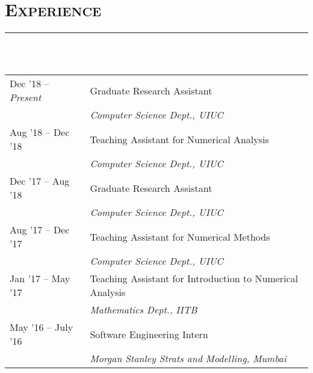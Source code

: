 \documentclass[letterpaper, 12pt]{article}
\begin{document}

\section*{\Large\textsc{Experience}}
\vspace{-4ex}
\rule{\textwidth}{0.1ex}\\
\vspace{1ex}\\
\begin{tabular}{p{} p{}}
Dec '18 -- \textit{Present} &   Graduate Research Assistant \\
                            &   \textit{\small Computer Science Dept., UIUC}\vspace{1ex}\\
Aug '18 -- Dec '18          &   Teaching Assistant for Numerical Analysis\\
                            &   \textit{\small Computer Science Dept., UIUC}\vspace{1ex}\\ 
Dec '17 -- Aug '18          &   Graduate Research Assistant \\
                            &   \textit{\small Computer Science Dept., UIUC}\vspace{1ex}\\
Aug '17 -- Dec '17          &   Teaching Assistant for Numerical Methods\\
                            &   \textit{\small Computer Science Dept., UIUC}\vspace{1ex}\\
Jan '17 -- May '17          &   Teaching Assistant for Introduction to Numerical Analysis\\
                            &   \textit{\small Mathematics Dept., IITB}\vspace{1ex}\\
May '16 -- July '16         &   Software Engineering Intern\\
                            &   \textit{\small Morgan Stanley Strats and Modelling, Mumbai}\\
\end{tabular}



\nocite{*}
\printbibliography[title={\Large\textsc{Publications}\vspace*{-2ex}\\\rule{\textwidth}{0.1ex}}]
\end{document}
